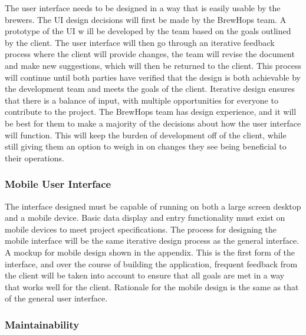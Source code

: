 \documentclass[draftclsnofoot,onecolumn,letterpaper,10pt]{IEEEtran}
\begin{document}
		The user interface needs to be designed in a way that is easily usable by the brewers.
		The UI design decisions will first be made by the BrewHops team.
		A prototype of the UI w ill be developed by the team based on the goals outlined by the client.
		The user interface will then go through an iterative feedback process where the client will provide changes, the team will revise the document and make new suggestions, which will then be returned to the client.
		This process will continue until both parties have verified that the design is both achievable by the development team and meets the goals of the client.
		Iterative design ensures that there is a balance of input, with multiple opportunities for everyone to contribute to the project.
		The BrewHops team has design experience, and it will be best for them to make a majority of the decisions about how the user interface will function.
		This will keep the burden of development off of the client, while still giving them an option to weigh in on changes they see being beneficial to their operations.

		\subsubsection{Mobile User Interface}

		The interface designed must be capable of running on both a large screen desktop and a mobile device.
		Basic data display and entry functionality must exist on mobile devices to meet project specifications.
		The process for designing the mobile interface will be the same iterative design process as the general interface.
		A mockup for mobile design shown in the appendix.
		This is the first form of the interface, and over the course of building the application, frequent feedback from the client will be taken into account to ensure that all goals are met in a way that works well for the client.
		Rationale for the mobile design is the same as that of the general user interface.

		\subsubsection{Maintainability}
\end{document}
